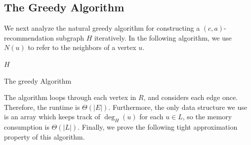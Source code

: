 \subsection{The Greedy Algorithm}
\label{greedy}

We next analyze the natural greedy algorithm for constructing a $(c,a)$-recommendation
subgraph $H$ iteratively. In the following algorithm, we use $N(u)$ to refer to the neighbors
of a vertex $u$. \vspace{0.05in}

\begin{algorithm}[h]
  \SetAlgoLined
  \Return $H$\;
  \caption{The greedy Algorithm}
\end{algorithm}

The algorithm loops through each vertex in $R$, and considers each edge once.
Therefore, the runtime is $\Theta(|E|)$. Furthermore, the only data structure
we use is an array which keeps track of $\deg_H(u)$ for each $u\in L$, so the
memory consumption is $\Theta(|L|)$. Finally, we prove the following tight
approximation property of this algorithm.

